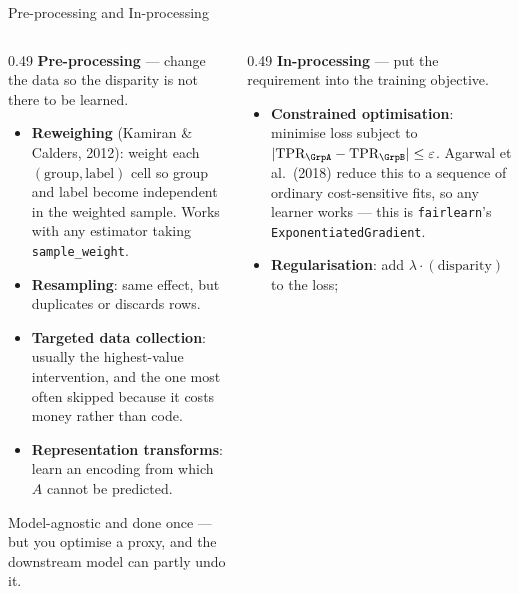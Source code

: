 \begin{frame}{Pre-processing and In-processing}

    \begin{columns}[T]
        \begin{column}{0.49\textwidth}
            \textbf{Pre-processing} --- change the data so the disparity is not there to be learned.
            \vspace{0.4em}
            \begin{itemize}\scriptsize
                \setlength\itemsep{0.32em}
                \item \textbf{Reweighing} (Kamiran \& Calders, 2012): weight each
                      $(\text{group},\text{label})$ cell so group and label become independent in
                      the weighted sample. Works with any estimator taking
                      \texttt{sample\_weight}.
                \item \textbf{Resampling}: same effect, but duplicates or discards rows.
                \item \textbf{Targeted data collection}: usually the highest-value intervention,
                      and the one most often skipped because it costs money rather than code.
                \item \textbf{Representation transforms}: learn an encoding from which $A$ cannot
                      be predicted.
            \end{itemize}
            \vspace{0.4em}
            {\scriptsize Model-agnostic and done once --- but you optimise a proxy, and the
            downstream model can partly undo it.}
        \end{column}
        \begin{column}{0.49\textwidth}
            \textbf{In-processing} --- put the requirement into the training objective.
            \vspace{0.4em}
            \begin{itemize}\scriptsize
                \setlength\itemsep{0.32em}
                \item \textbf{Constrained optimisation}: minimise loss subject to
                      $|\text{TPR}_\GrpA - \text{TPR}_\GrpB| \leq \varepsilon$. Agarwal et al.\ (2018)
                      reduce this to a sequence of ordinary cost-sensitive fits, so any learner
                      works --- this is \texttt{fairlearn}'s \texttt{ExponentiatedGradient}.
                \item \textbf{Regularisation}: add $\lambda \cdot (\text{disparity})$ to the loss;

\end{itemize}
\end{column}
\end{columns}
\end{frame}
